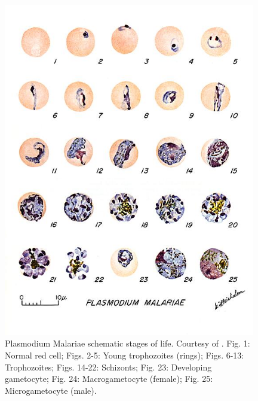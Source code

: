 \documentclass[final,a4paper,12pt,english]{UnicaPhdThesis3}
\begin{document}
\begin{figure}[!htbp]
	\centering
	\includegraphics[width=0.98\textwidth]{images/malaria_th/mal_mal}
	\caption{\label{fig:mal_th} Plasmodium Malariae schematic stages of life. Courtesy of \cite{Med_cdc}.
		Fig. 1: Normal red cell; Figs. 2-5: Young trophozoites (rings); Figs. 6-13: Trophozoites; Figs. 14-22: Schizonts; Fig. 23: Developing gametocyte; Fig. 24: Macrogametocyte (female); Fig. 25: Microgametocyte (male).}
\end{figure}
\end{document}
